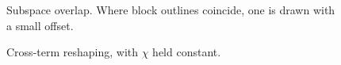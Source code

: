 \documentclass[11pt]{article}
\begin{document}
\begin{figure}[t]\centering
  \def\svgwidth{0.95\linewidth}
  
  \caption{Subspace overlap. Where block outlines coincide, one is drawn with a small offset.}
\end{figure}
\begin{figure}[t]\centering
  \def\svgwidth{0.95\linewidth}
  
  \caption{Cross-term reshaping, with $\chi$ held constant.}
\end{figure}
\end{document}
